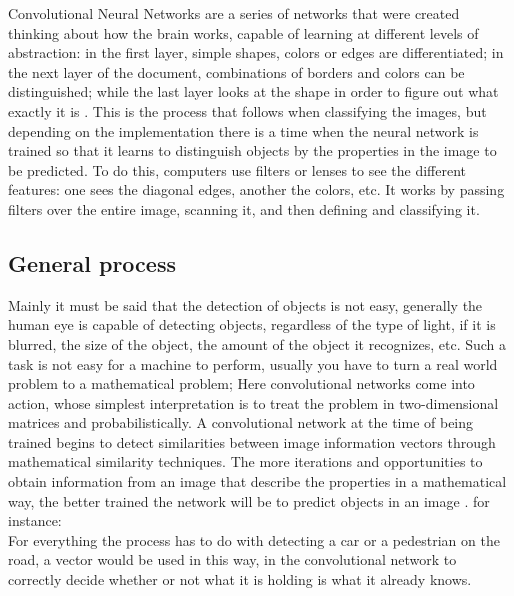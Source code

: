 Convolutional Neural Networks are a series of networks that were created
thinking about how the brain works, capable of learning at different levels of
abstraction: in the first layer, simple shapes, colors or edges are
differentiated; in the next layer of the document, combinations of borders and
colors can be distinguished; while the last layer looks at the shape in order to
figure out what exactly it is \cite{whatisacnn}. This is the process that follows when
classifying the images, but depending on the implementation there is a time
when the neural network is trained so that it learns to distinguish objects by
the properties in the image to be predicted. To do this, computers use filters
or lenses to see the different features: one sees the diagonal edges, another
the colors, etc. It works by passing filters over the entire image, scanning it,
and then defining and classifying it.

\subsection{General process}
Mainly it must be said that the detection of objects is not easy, generally the
human eye is capable of detecting objects, regardless of the type of light, if
it is blurred, the size of the object, the amount of the object it recognizes,
etc. Such a task is not easy for a machine to perform, usually you have to
turn a real world problem to a mathematical problem; Here convolutional networks
come into action, whose simplest interpretation is to treat the problem in
two-dimensional matrices and probabilistically. A convolutional network at the
time of being trained begins to detect similarities between image information
vectors through mathematical similarity techniques. The more iterations and
opportunities to obtain information from an image that describe the properties
in a mathematical way, the better trained the network will be to predict objects
in an image \cite{generalprocess}. for instance:\\

For everything the process has to do with detecting a car or a pedestrian on
the road, a vector would be used in this way, in the convolutional network to
correctly decide whether or not what it is holding is what it already knows.

